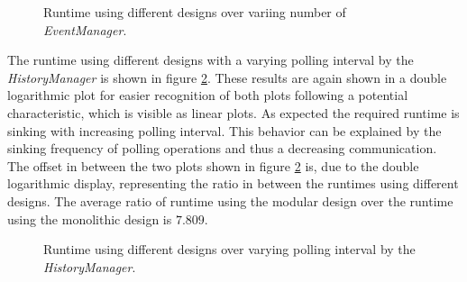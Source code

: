 \begin{figure}
    \centering
    \caption{Runtime using different designs over variing number of \emph{EventManager}.}
    \label{fig:results_runtime_eventmanager}
\end{figure}

The runtime using different designs with a varying polling interval by the \emph{HistoryManager} is shown in figure \ref{fig:results_runtime_polling}.
These results are again shown in a double logarithmic plot for easier recognition of both plots following a potential characteristic, which is visible as linear plots.
As expected the required runtime is sinking with increasing polling interval.
This behavior can be explained by the sinking frequency of polling operations and thus a decreasing communication.
The offset in between the two plots shown in figure \ref{fig:results_runtime_polling} is, due to the double logarithmic display, representing the ratio in between the runtimes using different designs.
The average ratio of runtime using the modular design over the runtime using the monolithic design is $7.809$.
\\
\begin{figure}
    \centering
    \caption{Runtime using different designs over varying polling interval by the \emph{HistoryManager}.}
    \label{fig:results_runtime_polling}
\end{figure}

